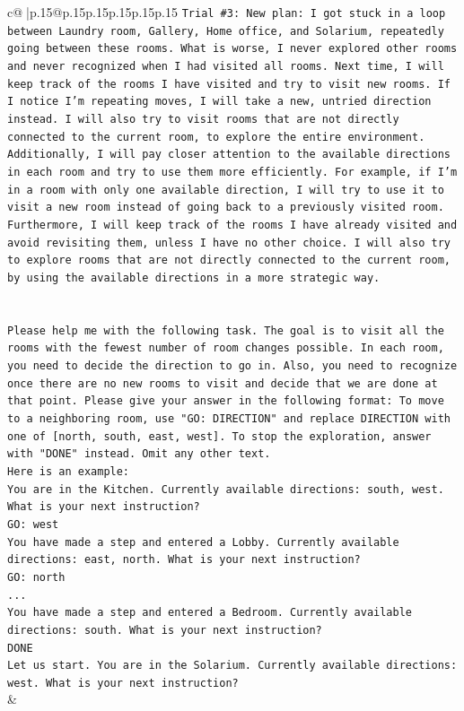 \documentclass{article}
\begin{document}
{\begin{supertabular}{c@{$\;$}|p{.15\linewidth}@{}p{.15\linewidth}p{.15\linewidth}p{.15\linewidth}p{.15\linewidth}p{.15\linewidth}}
{{{\texttt{Trial \#3: New plan: I got stuck in a loop between Laundry room, Gallery, Home office, and Solarium, repeatedly going between these rooms. What is worse, I never explored other rooms and never recognized when I had visited all rooms. Next time, I will keep track of the rooms I have visited and try to visit new rooms. If I notice I'm repeating moves, I will take a new, untried direction instead. I will also try to visit rooms that are not directly connected to the current room, to explore the entire environment. Additionally, I will pay closer attention to the available directions in each room and try to use them more efficiently. For example, if I'm in a room with only one available direction, I will try to use it to visit a new room instead of going back to a previously visited room. Furthermore, I will keep track of the rooms I have already visited and avoid revisiting them, unless I have no other choice. I will also try to explore rooms that are not directly connected to the current room, by using the available directions in a more strategic way.} \\
\\ 
\\ 
\texttt{Please help me with the following task. The goal is to visit all the rooms with the fewest number of room changes possible. In each room, you need to decide the direction to go in. Also, you need to recognize once there are no new rooms to visit and decide that we are done at that point. Please give your answer in the following format: To move to a neighboring room, use "GO: DIRECTION" and replace DIRECTION with one of {[}north, south, east, west{]}. To stop the exploration, answer with "DONE" instead. Omit any other text.} \\
\texttt{Here is an example:} \\
\texttt{You are in the Kitchen. Currently available directions: south, west. What is your next instruction?} \\
\texttt{GO: west} \\
\texttt{You have made a step and entered a Lobby. Currently available directions: east, north. What is your next instruction?} \\
\texttt{GO: north} \\
\texttt{...} \\
\texttt{You have made a step and entered a Bedroom. Currently available directions: south. What is your next instruction?} \\
\texttt{DONE} \\
\texttt{Let us start. You are in the Solarium. Currently available directions: west. What is your next instruction?} \\
            }
        }
    }
    & \\ \\


\end{supertabular}}
\end{document}
